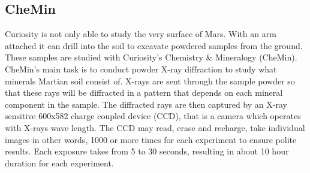 \subsection{CheMin}
Curiosity is not only able to study the very surface of Mars.
With an arm attached it can drill into the soil to excavate powdered samples from the ground.
These samples are studied with Curiosity's Chemistry & Mineralogy (CheMin).
CheMin's main task is to conduct powder X-ray diffraction to study what minerals Martian soil consist of.
X-rays are sent through the sample powder so that these rays will be diffracted in a pattern that depends on each mineral component in the sample.
The diffracted rays are then captured by an X-ray sensitive 600x582 charge coupled device (CCD), that is a camera which operates with X-rays wave length.
The CCD may read, erase and recharge, take individual images in other words, 1000 or more times for each experiment to ensure polite results.
Each exposure takes from 5 to 30 seconds, resulting in about 10 hour duration for each experiment. \cite{CheMin}